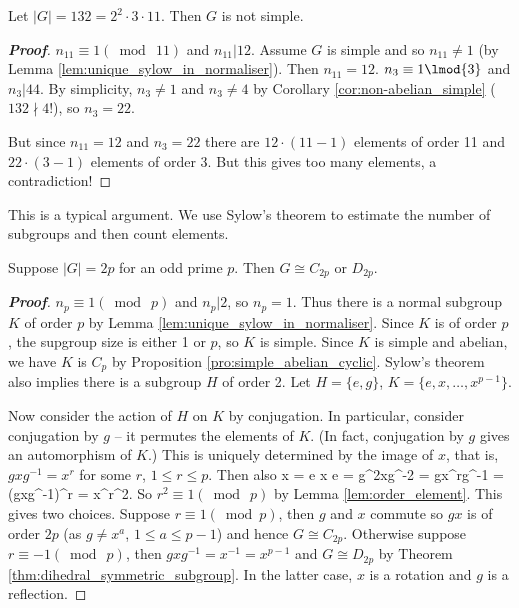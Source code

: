 \begin{example}
Let $|G| = 132 = 2^2 \cdot 3 \cdot 11$. Then $G$ is not simple.
\end{example}

\begin{proof}[\bf Proof]
$n_{11} \equiv 1 (\bmod\ \! 11)$ and $n_{11} | 12$. Assume $G$ is simple and so $n_{11} \neq 1$ (by Lemma \ref{lem:unique_sylow_in_normaliser}). Then $n_{11} = 12$. $n_3 \equiv 1 \lmod{3}$ and $n_3 | 44$. By simplicity, $n_3 \neq 1$ and $n_3 \neq 4$ by Corollary \ref{cor:non-abelian_simple} ($132\nmid 4!$), so $n_3 = 22$.

But since $n_{11} = 12$ and $n_3 = 22$ there are $12\cdot(11-1)$ elements of order 11 and $22\cdot(3-1)$ elements of order 3. But this gives too many elements, a contradiction!
\end{proof}

\begin{remark}
This is a typical argument. We use Sylow's theorem to estimate the number of subgroups and then count elements.
\end{remark}

\begin{lemma}
Suppose $|G| = 2p$ for an odd prime $p$. Then $G \cong C_{2p}$ or $D_{2p}$.
\end{lemma}

\begin{proof}[\bf Proof]
$n_p \equiv 1 (\bmod\ \! p)$ and $n_p | 2$, so $n_p = 1$. Thus there is a normal subgroup $K$ of order $p$ by Lemma \ref{lem:unique_sylow_in_normaliser}. Since $K$ is of order $p$, the supgroup size is either 1 or $p$, so $K$ is simple. Since $K$ is simple and abelian, we have $K$ is $C_p$ by Proposition \ref{pro:simple_abelian_cyclic}. Sylow's theorem also implies there is a subgroup $H$ of order 2. Let $H = \{e, g\}$, $K = \{e, x,\dots , x^{p-1}\}$. %

Now consider the action of $H$ on $K$ by conjugation. In particular, consider conjugation by $g$ -- it permutes the elements of $K$. (In fact, conjugation by $g$ gives an automorphism of $K$.) This is uniquely determined by the image of $x$, that is, $gxg^{-1} = x^r$ for some $r$, $1\leq r \leq p$. Then also
\be
x = e x e =  g^2xg^{-2} = gx^rg^{-1} = (gxg^{-1})^r = x^{r^2}.
\ee
So $r^2 \equiv 1(\bmod\ \! p)$ by Lemma \ref{lem:order_element}. This gives two choices. Suppose $r \equiv 1 (\bmod p)$, then $g$ and $x$ commute so $gx$ is of order $2p$ (as $g \neq x^a$, $1\leq a \leq p-1$) and hence $G \cong C_{2p}$. Otherwise suppose $r \equiv -1 (\bmod\ \! p)$, then $gxg^{-1} = x^{-1} = x^{p-1}$ and $G \cong D_{2p}$ by Theorem \ref{thm:dihedral_symmetric_subgroup}. In the latter case, $x$ is a rotation and $g$ is a reflection.
\end{proof}

